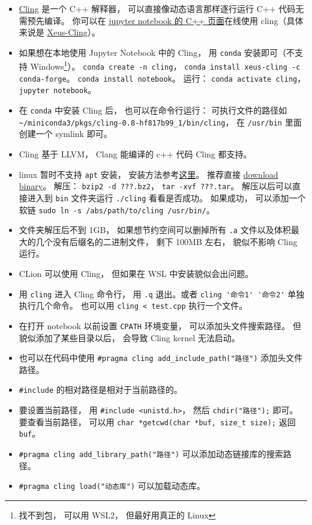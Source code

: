 
\begin{issues}
\issueDraft
\end{issues}

\begin{itemize}
\item \href{https://root.cern/cling/}{Cling} 是一个 C++ 解释器， 可以直接像动态语言那样逐行运行 C++ 代码无需预先编译。
你可以在 \href{https://jupyter.org/try}{jupyter notebook 的 C++ 页面}在线使用 cling（具体来说是 \href{https://xeus-cling.readthedocs.io/en/latest/index.html}{Xeus-Cling}）。
\item 如果想在本地使用 Jupyter Notebook 中的 Cling， 用 \verb|conda| 安装即可（不支持 Windows\footnote{找不到包， 可以用 WSL2， 但最好用真正的 Linux}）。 \verb|conda create -n cling|， \verb|conda install xeus-cling -c conda-forge|。 \verb|conda install notebook|。 运行： \verb|conda activate cling|， \verb|jupyter notebook|。
\item 在 \verb|conda| 中安装 Cling 后， 也可以在命令行运行： 可执行文件的路径如 \verb|~/miniconda3/pkgs/cling-0.8-hf817b99_1/bin/cling|， 在 \verb|/usr/bin| 里面创建一个 symlink 即可。
\item Cling 基于 LLVM， Clang 能编译的 c++ 代码 Cling 都支持。
\item linux 暂时不支持 \verb|apt| 安装， 安装方法参考\href{https://kaustubh13.medium.com/how-to-install-cling-on-linux-or-wsl-8125798ed9b9}{这里}。 推荐直接 \href{https://root.cern/download/cling/}{download binary}。 解压： \verb|bzip2 -d ???.bz2|， \verb|tar -xvf ???.tar|。 解压以后可以直接进入到 \verb|bin| 文件夹运行 \verb|./cling| 看看是否成功。 如果成功， 可以添加一个软链 \verb|sudo ln -s /abs/path/to/cling /usr/bin/|。
\item 文件夹解压后不到 1GB， 如果想节约空间可以删掉所有 \verb|.a| 文件以及体积最大的几个没有后缀名的二进制文件， 剩下 100MB 左右， 貌似不影响 Cling 运行。
\item CLion 可以使用 Cling， 但如果在 WSL 中安装貌似会出问题。
\item 用 \verb|cling| 进入 Cling 命令行， 用 \verb|.q| 退出。或者 \verb|cling '命令1' '命令2'| 单独执行几个命令。 也可以用 \verb|cling < test.cpp| 执行一个文件。
\item 在打开 notebook 以前设置 \verb|CPATH| 环境变量， 可以添加头文件搜索路径。 但貌似添加了某些目录以后， 会导致 Cling kernel 无法启动。
\item 也可以在代码中使用 \verb|#pragma cling add_include_path("路径")| 添加头文件路径。
\item \verb|#include| 的相对路径是相对于当前路径的。
\item 要设置当前路径， 用 \verb|#include <unistd.h>|， 然后 \verb|chdir("路径");| 即可。 要查看当前路径， 可以用 \verb|char *getcwd(char *buf, size_t size);| 返回 \verb|buf|。
\item \verb|#pragma cling add_library_path("路径")| 可以添加动态链接库的搜索路径。
\item \verb|#pragma cling load("动态库")| 可以加载动态库。
\end{itemize}
